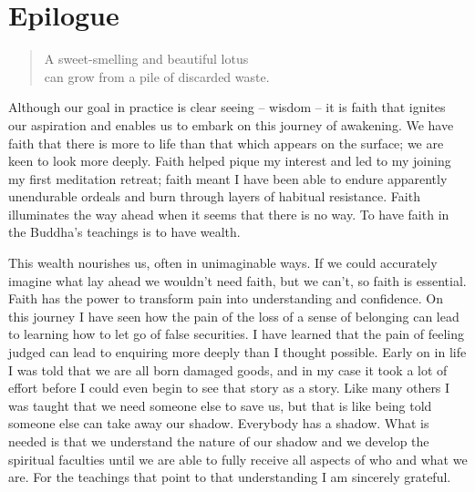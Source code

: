 \chapter{Epilogue}

\begin{quote}
A sweet-smelling and beautiful lotus\\
can grow from a pile of discarded waste.

\end{quote}

Although our goal in practice is clear seeing -- wisdom -- it is faith
that ignites our aspiration and enables us to embark on this journey of
awakening. We have faith that there is more to life than that which
appears on the surface; we are keen to look more deeply. Faith helped
pique my interest and led to my joining my first meditation retreat;
faith meant I have been able to endure apparently unendurable ordeals
and burn through layers of habitual resistance. Faith illuminates the
way ahead when it seems that there is no way. To have faith in the
Buddha's teachings is to have wealth.

This wealth nourishes us, often in unimaginable ways. If we could
accurately imagine what lay ahead we wouldn't need faith, but we can't,
so faith is essential. Faith has the power to transform pain into
understanding and confidence. On this journey I have seen how the pain
of the loss of a sense of belonging can lead to learning how to let go
of false securities. I have learned that the pain of feeling judged can
lead to enquiring more deeply than I thought possible. Early on in life
I was told that we are all born damaged goods, and in my case it took a
lot of effort before I could even begin to see that story as a story.
Like many others I was taught that we need someone else to save us, but
that is like being told someone else can take away our shadow. Everybody
has a shadow. What is needed is that we understand the nature of our
shadow and we develop the spiritual faculties until we are able to fully
receive all aspects of who and what we are. For the teachings that point
to that understanding I am sincerely grateful.

